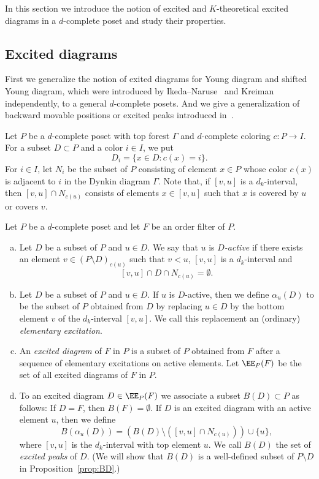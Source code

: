 In this section we introduce the notion of excited and $K$-theoretical excited diagrams 
in a $d$-complete poset and study their properties.

\subsection{%
Excited diagrams
}

First we generalize the notion of exited diagrams for Young diagram and shifted Young diagram, 
which were introduced by Ikeda--Naruse~\cite{IN1} and Kreiman~\cite{Kr1, Kr2} independently, 
to a general $d$-complete posets.
And we give a generalization of backward movable positions or excited peaks 
introduced in~\cite{IN2, KN, MPP}.

Let $P$ be a $d$-complete poset with top forest $\Gamma$ and $d$-complete coloring $c : P \to I$.
For a subset $D \subset P$ and a color $i \in I$, we put
$$
D_i = \{ x \in D : c(x) = i \}.
$$
For $i \in I$, let $N_i$ be the subset of $P$ consisting of element $x \in P$ whose color 
$c(x)$ is adjacent to $i$ in the Dynkin diagram $\Gamma$.
Note that, if $[v,u]$ is a $d_k$-interval, then $[v,u] \cap N_{c(u)}$ consists of elements $x \in [v,u]$ 
such that $x$ is covered by $u$ or covers $v$.

\begin{defi}
\label{def:excited}
Let $P$ be a $d$-complete poset and let $F$ be an order filter of $P$.
\begin{enumerate}[(a)]
\item\label{defi3.1_a} %
Let $D$ be a subset of $P$ and $u \in D$.
We say that $u$ is \emph{$D$-active} 
if there exists an element $v \in (P \setminus D)_{c(u)}$ 
such that $v < u$, $[v,u]$ is a $d_k$-interval and
$$
[v,u] \cap D \cap N_{c(u)} = \emptyset.
$$
\item\label{defi3.1_b} %
Let $D$ be a subset of $P$ and $u \in D$.
If $u$ is $D$-active, then we define $\alpha_u(D)$ to be the subset of $P$ obtained from $D$ by 
replacing $u \in D$ by the bottom element $v$ of the $d_k$-interval $[v,u]$.
We call this replacement an (ordinary) \emph{elementary excitation}.
\item\label{defi3.1_c} %
An \emph{excited diagram} of $F$ in $P$ is a subset of $P$ 
obtained from $F$ after a sequence of elementary excitations on active elements. 
Let $\EE_P(F)$ be the set of all excited diagrams of $F$ in $P$.
\item\label{defi3.1_d} %
To an excited diagram $D \in \EE_P(F)$ we associate a subset $B(D) \subset P$ as follows:
If $D = F$, then $B(F) = \emptyset$.
If $D$ is an excited diagram with an active element $u$, then we define
$$
B(\alpha_u(D))
 = 
\left( B(D) \setminus ([v,u] \cap N_{c(u)}) \right) \cup \{ u \},
$$
where $[v,u]$ is the $d_k$-interval with top element $u$.
We call $B(D)$ the set of \emph{excited peaks} of $D$.
(We will show that $B(D)$ is a well-defined subset of $P \setminus D$ in Proposition~\ref{prop:BD}.)
\end{enumerate}
\end{defi}

